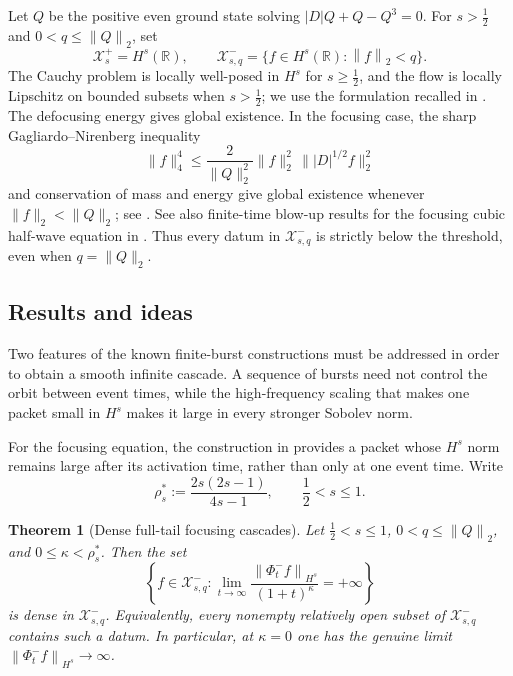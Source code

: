 \documentclass[10pt,a4paper]{amsart}
\numberwithin{equation}{section}
\newtheorem{theorem}{Theorem}[section]
\newcommand{\R}{\mathbb R}
\newcommand{\X}{\mathcal X}
\newcommand{\half}{\frac12}
\newcommand{\norm}[1]{\left\lVert #1\right\rVert}
\newcommand{\flow}[1]{\Phi^{#1}}
\begin{document}
Let $Q$ be the positive even ground state solving
$|D|Q+Q-Q^3=0$.  For $s>\half$ and $0<q\leq\norm Q_2$, set
\begin{equation}\label{eq:spaces}
 \X^+_s=H^s(\R),
 \qquad
 \X^-_{s,q}=\{f\in H^s(\R):\norm f_2<q\}.
\end{equation}
The Cauchy problem is locally well-posed in $H^s$ for $s\geq\half$, and the
flow is locally Lipschitz on bounded subsets when $s>\half$; we use the
formulation recalled in \cite{ChoffrutPocovnicu}.  The defocusing energy gives
global existence.  In the focusing case, the sharp Gagliardo--Nirenberg
inequality
\[
 \|f\|_4^4\leq \frac{2}{\|Q\|_2^2}
 \|f\|_2^2\,\||D|^{1/2}f\|_2^2
\]
and conservation of mass and energy give global existence whenever
$\|f\|_2<\|Q\|_2$; see \cite{FrankLenzmann,KLR,GLPR}. See also finite-time blow-up results for the focusing cubic half-wave equation in \cite{KLR,CaoSuZhang,KimKwonParkBW,KimKwonParkLogLog,ParkNegativeEnergy}.  Thus every datum in
$\X^-_{s,q}$ is strictly below the threshold, even when
$q=\|Q\|_2$.

\subsection{Results and ideas}

Two features of the known finite-burst constructions must be addressed in
order to obtain a smooth infinite cascade.  A sequence of bursts need not
control the orbit between event times, while the high-frequency scaling that
makes one packet small in $H^s$ makes it large in every stronger Sobolev norm.

For the focusing equation, the construction in \cite{GLPR} provides a packet whose
$H^s$ norm remains large after its activation time, rather than only at one
event time.  Write
\begin{equation}\label{eq:rho-star}
 \rho_s^*:=\frac{2s(2s-1)}{4s-1},
 \qquad \half<s\leq1.
\end{equation}

\begin{theorem}[Dense full-tail focusing cascades]\label{thm:limit}
Let $\half<s\leq1$, $0<q\leq\norm Q_2$, and
$0\leq\kappa<\rho_s^*$.  Then the set
\begin{equation}\label{eq:limit-set}
 \left\{f\in\X^-_{s,q}:
 \lim_{t\to\infty}
 \frac{\norm{\flow-_tf}_{H^s}}{(1+t)^\kappa}=+\infty\right\}
\end{equation}
is dense in $\X^-_{s,q}$.  Equivalently, every nonempty relatively open
subset of $\X^-_{s,q}$ contains such a datum.  In particular, at $\kappa=0$
one has the genuine limit $\norm{\flow-_tf}_{H^s}\to\infty$.
\end{theorem}
\end{document}
